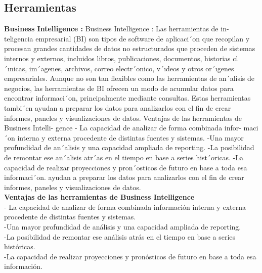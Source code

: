 \documentclass[%
 reprint,
 amsmath,amssymb,
 aps,
]{revtex4-1}
\begin{document}
\subsection{Herramientas}
\textbf{Business Intelligence :}
Business Intelligence : Las herramientas de in- teligencia empresarial (BI) son tipos de software de aplicaci´on  que  recopilan  y  procesan  grandes  cantidades de datos no estructurados que proceden de sistemas internos y externos, incluidos libros, publicaciones, documentos,    historias    cl´ınicas,    im´agenes,    archivos, correo electr´onico, v´ıdeos y otros or´ıgenes empresariales. Aunque no son tan flexibles como las herramientas de an´alisis  de  negocios,  las  herramientas  de  BI  ofrecen  un modo  de  acumular  datos  para  encontrar  informaci´on, principalmente mediante consultas. Estas herramientas tambi´en  ayudan  a  preparar  los  datos  para  analizarlos con el fin de crear informes, paneles y visualizaciones de datos.
Ventajas de las herramientas de Business Intelli- gence
- La capacidad de analizar de forma combinada infor- maci´on interna y externa procedente de distintas fuentes y sistemas.
-Una  mayor  profundidad  de  an´alisis  y  una  capacidad ampliada de reporting.
-La   posibilidad   de   remontar   ese   an´alisis   atr´as   en   el tiempo en base a series hist´oricas.
-La  capacidad  de  realizar  proyecciones  y  pron´osticos  de futuro en base a toda esa informaci´on.
 ayudan a preparar los datos para analizarlos con el fin de crear informes, paneles y visualizaciones de datos.\\
\textbf{ Ventajas de las herramientas de Business Intelligence}\\
- La capacidad de analizar de forma combinada información interna y externa procedente de distintas fuentes y sistemas.\\
-Una mayor profundidad de análisis y una capacidad ampliada de reporting.\\
-La posibilidad de remontar ese análisis atrás en el tiempo en base a series históricas.\\
-La capacidad de realizar proyecciones y pronósticos de futuro en base a toda esa información.\\
\end{document}
